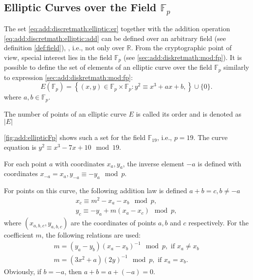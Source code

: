 \subsection{Elliptic Curves over the Field $\mathbb{F}_p$}
The set \eqref{eq:add:discretmath:elliptic:er} together with the addition operation \eqref{eq:add:discretmath:elliptic:add} can be defined over an arbitrary field (see definition \ref{def:field}), , i.e., not only over $\mathbb{R}$. From the cryptographic point of view, special interest lies in the field $\mathbb{F}_p$ (see \autoref{sec:add:diskretmath:mod:fp}). It is possible to define the set of elements of an elliptic curve over the field $\mathbb{F}_p$ similarly to expression \eqref{sec:add:diskretmath:mod:fp}:
\begin{equation}
E\left(\mathbb{F}_p\right) = \left\{ (x,y) \in 
\mathbb{F}_p \times \mathbb{F}_p: 
y^2 \equiv x^3 +ax +b, 
\right\} \cup \{0\}.
\label{eq:add:discretmath:elliptic:fp}
\end{equation}
where $a,b \in \mathbb{F}_p$.

\begin{definition}
\label{def:elliptic_curve_order}
The number of points of an elliptic curve $E$ is called its order and is denoted as $\left|E\right|$
\end{definition}



\autoref{fig:add:ellipticFp} shows such a set for the field
$\mathbb{F}_{19}$, i.e., $p = 19$. The curve equation is $y^2 \equiv x^3 -7 x + 10 \mod 19$. 

For each point $a$ with coordinates $x_a, y_a$, the inverse element $-a$ is defined with coordinates $x_{-a} = x_a, y_{-a} \equiv -y_a \mod p$.

For points on this curve, the following addition law is defined $a + b = c,
b \ne -a$
\begin{eqnarray}
x_{c} \equiv m^2 - x_a - x_b \mod p,
\nonumber \\
y_{c} \equiv - y_a + m \left(x_a - x_c\right) \mod p,
\label{eq:add:discretmath:elliptic:addfp}
\end{eqnarray}
where $(x_{a,b,c}, y_{a,b,c})$ are the coordinates of points $a,b$ and $c$ respectively. For the coefficient $m$, the following relations are used: 
\begin{eqnarray}
m = \left(y_a - y_b\right)\left(x_a - x_b\right)^{-1} \mod p, \mbox{ if } x_a \ne x_b
\nonumber \\
m = \left(3x^2 + a\right)\left(2y\right)^{-1} \mod p, \mbox{ if }
x_a = x_b.
\nonumber
\end{eqnarray}
Obviously, if $b = -a$, then $a + b = a + (-a) = 0$.

